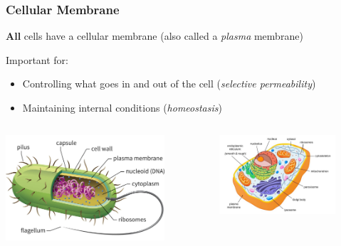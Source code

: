 \documentclass[10pt]{beamer}
\begin{document}
\begin{frame}[t]
\frametitle{Cellular Membrane}
\vspace{0.5cm}

	\textbf{All} cells have a cellular membrane (also called a \emph{plasma} membrane)\\

	\vspace{0.5cm}
	
	Important for:
		\smallskip
		\begin{itemize}
			\item Controlling what goes in and out of the cell (\textcolor{myblue}{\emph{selective permeability}})
			\smallskip
			\item Maintaining internal conditions (\textcolor{myblue}{\emph{homeostasis}})
		\end{itemize}
	
	\begin{columns}
		\begin{column}{0.5\textwidth}
			\begin{center}
				\includegraphics[width=0.8\textwidth]{figures/bacteria_cell.jpg}
			\end{center}	
		\end{column}
		
		\begin{column}{0.5\textwidth}
			\begin{center}
				\includegraphics[width=0.8\textwidth]{figures/animal.jpg}
			\end{center}	
		\end{column}
	\end{columns}	
\end{frame}
\end{document}
